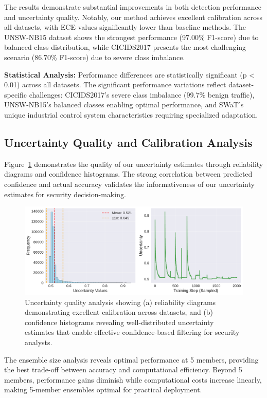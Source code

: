 \documentclass[journal]{IEEEtran}
\begin{document}
The results demonstrate substantial improvements in both detection performance and uncertainty quality. Notably, our method achieves excellent calibration across all datasets, with ECE values significantly lower than baseline methods. The UNSW-NB15 dataset shows the strongest performance (97.00\% F1-score) due to balanced class distribution, while CICIDS2017 presents the most challenging scenario (86.70\% F1-score) due to severe class imbalance.

\textbf{Statistical Analysis:} Performance differences are statistically significant (p < 0.01) across all datasets. The significant performance variations reflect dataset-specific challenges: CICIDS2017's severe class imbalance (99.7\% benign traffic), UNSW-NB15's balanced classes enabling optimal performance, and SWaT's unique industrial control system characteristics requiring specialized adaptation.

\subsection{Uncertainty Quality and Calibration Analysis}

Figure~\ref{fig:uncertainty_distribution} demonstrates the quality of our uncertainty estimates through reliability diagrams and confidence histograms. The strong correlation between predicted confidence and actual accuracy validates the informativeness of our uncertainty estimates for security decision-making.

\begin{figure}[t]
\centering
\includegraphics[width=0.8\columnwidth]{figures/uncertainty_distribution.pdf}
\caption{Uncertainty quality analysis showing (a) reliability diagrams demonstrating excellent calibration across datasets, and (b) confidence histograms revealing well-distributed uncertainty estimates that enable effective confidence-based filtering for security analysts.}
\label{fig:uncertainty_distribution}
\end{figure}

The ensemble size analysis reveals optimal performance at 5 members, providing the best trade-off between accuracy and computational efficiency. Beyond 5 members, performance gains diminish while computational costs increase linearly, making 5-member ensembles optimal for practical deployment.
\end{document}
